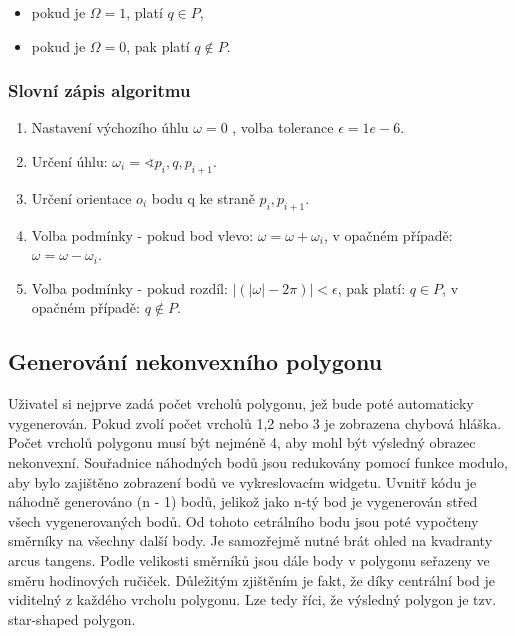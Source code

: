 \documentclass[a4paper,11pt,twoside]{article}
\begin{document}
\begin{itemize}
\item pokud je $\Omega = 1$, platí $q \in P$, 
\item pokud je $\Omega = 0$, pak platí $q { \not \in } P$.
\end{itemize}

\newpage
\vspace*{-1cm}
\subsubsection{Slovní zápis algoritmu}
\begin{enumerate}
\item Nastavení výchozího úhlu $\omega = 0$ , volba tolerance $\epsilon = 1e-6$.
\item Určení úhlu: $\omega_i = \sphericalangle p_i, q, p_{i+1}$.
\item Určení orientace $o_i$ bodu q ke straně $p_i, p_{i+1}$.
\item Volba podmínky - pokud bod vlevo: $\omega = \omega + \omega_i$, v opačném případě: $\omega = \omega - \omega_i$.
\item Volba podmínky - pokud rozdíl: $|(|\omega| - 2\pi)| < \epsilon$, pak platí: $q \in P$, v opačném případě:  $ q { \not \in } P $.
\end{enumerate}

\subsection{Generování nekonvexního polygonu}
Uživatel si nejprve zadá počet vrcholů polygonu, jež bude poté automaticky vygenerován. Pokud zvolí počet vrcholů 1,2 nebo 3 je zobrazena chybová hláška. Počet vrcholů polygonu musí být nejméně 4, aby mohl být výsledný obrazec nekonvexní. 
Souřadnice náhodných bodů jsou redukovány pomocí funkce modulo, aby bylo zajištěno zobrazení bodů ve vykreslovacím widgetu. Uvnitř kódu je náhodně generováno (n - 1) bodů, jelikož jako n-tý bod je vygenerován střed všech vygenerovaných bodů. Od tohoto cetrálního bodu jsou poté vypočteny směrníky na všechny další body. Je samozřejmě nutné brát ohled na kvadranty arcus tangens. Podle velikosti směrníků jsou dále body v polygonu seřazeny ve směru hodinových ručiček. Důležitým zjištěním je fakt, že díky centrální bod je viditelný z každého vrcholu polygonu. Lze tedy říci, že výsledný polygon je tzv. star-shaped polygon.
\end{document}
